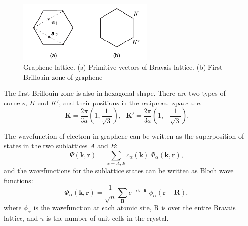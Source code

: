 \documentclass[pdflatex, sectionletters, 12pt, final, phd]{pittetd}    %
\begin{document}
\begin{figure}[h!]
	\centering
	\includegraphics[width=0.6\textwidth]{Drawing/Bravais.pdf}
	\caption[Graphene lattice]{Graphene lattice. (a) Primitive vectors of Bravais lattice. (b) First Brillouin zone of graphene.}
	\label{FIG:Bravais}
\end{figure}

The first Brillouin zone is also in hexagonal shape. There are two types of corners, $K$ and $K'$, and their positions in the reciprocal space are:
$$\mathbf{K} = \frac{2\pi}{3a}\left(1, \frac{1}{\sqrt{3}}\right), \ \ \ \mathbf{K'} =  \frac{2\pi}{3a}\left(1, -\frac{1}{\sqrt{3}}\right).$$

The wavefunction of electron in graphene can be written as the superposition of states in the two sublattices $A$ and $B$:
$$\Psi(\mathbf{k}, \mathbf{r}) = \sum_{\alpha = A, B}c_{\alpha}(\mathbf{k}) \ \Phi_{\alpha}(\mathbf{k}, \mathbf{r}),$$
and the wavefunctions for the sublattice states can be written as Bloch wave functions:
$$\Phi_{\alpha}(\mathbf{k}, \mathbf{r}) = \frac{1}{\sqrt{n}}\sum_\mathbf{R} e^{-i \mathbf{k} \cdot \mathbf{R}} \ \phi_{\alpha}(\mathbf{r} - \mathbf{R}),$$
where $\phi_{\alpha}$ is the wavefunction at each atomic site, R is over the entire Bravais lattice, and $n$ is the number of unit cells in the crystal. 
\end{document}
